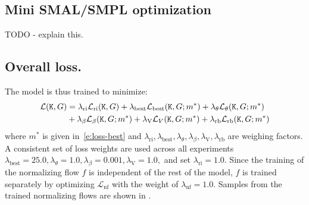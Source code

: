 \subsection{Mini SMAL/SMPL optimization}

TODO - explain this.

\subsection{Overall loss.}

The model is thus trained to minimize:
\begin{equation}\label{e:loss-total}
  \begin{aligned}
    \mathcal{L}(\mathtt{K},G)&=
    \lambda_\text{ri} \mathcal{L}_\text{ri}(\mathtt{K},G) +
    \lambda_\text{best} \mathcal{L}_\text{best}(\mathtt{K},G;m^*) +
    \lambda_\theta \mathcal{L}_\theta(\mathtt{K},G;m^*) \\& +
    \lambda_\beta \mathcal{L}_\beta(\mathtt{K},G;m^*) +
    \lambda_\text{V} \mathcal{L}_V(\mathtt{K},G;m^*) +
    \lambda_\text{rb} \mathcal{L}_\text{rb}(\mathtt{K},G;m^*)
  \end{aligned}
\end{equation}
where $m^*$ is given in~\cref{e:loss-best} and
$
\lambda_\text{ri},
\lambda_\text{best},
\lambda_\theta,
\lambda_\beta,
\lambda_\text{V},
\lambda_\text{rb}
$
are weighing factors.
A consistent set of loss weights are used across all experiments
$\lambda_\text{best}= 25.0, \lambda_\theta=1.0,
\lambda_\beta=0.001,
\lambda_\text{V}=1.0,
$ and set $\lambda_\text{ri} = 1.0$.
%
Since the training of the normalizing flow $f$ is independent of the rest of the model, $f$ is trained separately by optimizing $\mathcal{L}_\text{nf}$ with the weight of $\lambda_\text{nf}=1.0$. Samples from the trained normalizing flows are shown in .

